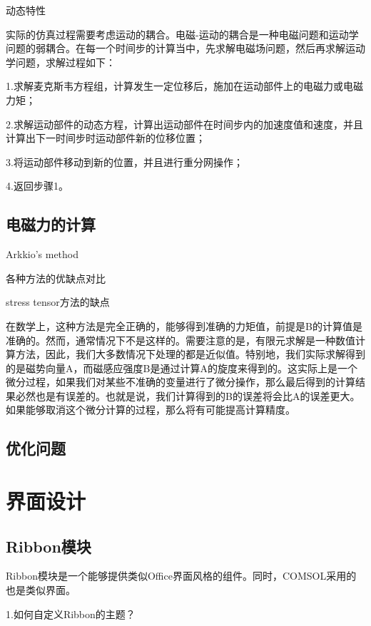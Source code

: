 动态特性

实际的仿真过程需要考虑运动的耦合。电磁-运动的耦合是一种电磁问题和运动学问题的弱耦合。在每一个时间步的计算当中，先求解电磁场问题，然后再求解运动学问题，求解过程如下：

1.求解麦克斯韦方程组，计算发生一定位移后，施加在运动部件上的电磁力或电磁力矩；

2.求解运动部件的动态方程，计算出运动部件在时间步内的加速度值和速度，并且计算出下一时间步时运动部件新的位移位置；

3.将运动部件移动到新的位置，并且进行重分网操作；

4.返回步骤1。

\subsection{电磁力的计算}

Arkkio’s method


各种方法的优缺点对比

stress tensor方法的缺点

在数学上，这种方法是完全正确的，能够得到准确的力矩值，前提是B的计算值是准确的。然而，通常情况下不是这样的。需要注意的是，有限元求解是一种数值计算方法，因此，我们大多数情况下处理的都是近似值。特别地，我们实际求解得到的是磁势向量A，而磁感应强度B是通过计算A的旋度来得到的。这实际上是一个微分过程，如果我们对某些不准确的变量进行了微分操作，那么最后得到的计算结果必然也是有误差的。也就是说，我们计算得到的B的误差将会比A的误差更大。如果能够取消这个微分计算的过程，那么将有可能提高计算精度。
\subsection{优化问题}

\section{界面设计}

\subsection{Ribbon模块}
Ribbon模块是一个能够提供类似Office界面风格的组件。同时，COMSOL采用的也是类似界面。

1.如何自定义Ribbon的主题？
